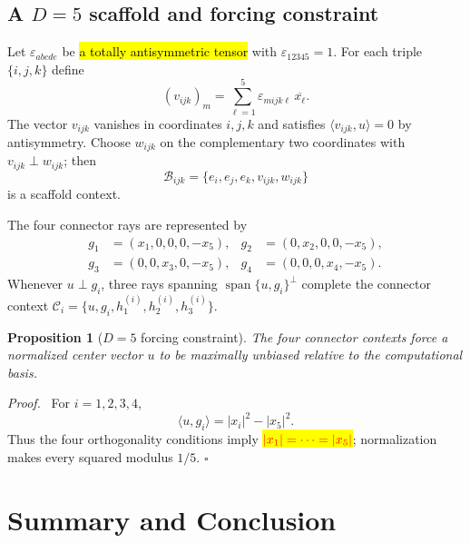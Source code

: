 \documentclass[%
  reprint,
  superscriptaddress,
  showpacs,
  showkeys,
  amsmath,amssymb,
  pra,
  longbibliography,
  floatfix,
  x11names
]{revtex4-2}
\newenvironment{revision}{\begingroup}{\endgroup}
\newcommand{\corr}[1]{{\color{red}\hl{#1}}}
\newcommand{\corrmath}[1]{\begingroup\setlength{\fboxsep}{1pt}\colorbox{yellow}{\ensuremath{\color{red}#1}}\endgroup}
\newtheorem{proposition}{Proposition}
\newenvironment{proof}{\par\noindent\textit{Proof.}\ }{\hfill$\square$\par}
\begin{document}
\begin{revision}
\subsection{A $D=5$ scaffold and forcing constraint}

Let $\varepsilon_{abcde}$ be \corr{a totally antisymmetric tensor}
with $\varepsilon_{12345}=1$.  For each triple $\{i,j,k\}$ define
\[
(v_{ijk})_m=\sum_{\ell=1}^5\varepsilon_{mijk\ell}\,\overline{x_\ell}.
\]
The vector $v_{ijk}$ vanishes in coordinates $i,j,k$ and satisfies $\langle v_{ijk},u\rangle=0$ by antisymmetry.  Choose $w_{ijk}$ on the complementary two coordinates with $v_{ijk}\perp w_{ijk}$; then
\[
\mathcal{B}_{ijk}=\{e_i,e_j,e_k,v_{ijk},w_{ijk}\}
\]
is a scaffold context.

The four connector rays are represented by
\begin{align*}
g_1&=(x_1,0,0,0,-x_5),&
g_2&=(0,x_2,0,0,-x_5),\\
g_3&=(0,0,x_3,0,-x_5),&
g_4&=(0,0,0,x_4,-x_5).
\end{align*}
Whenever $u\perp g_i$, three rays spanning $\operatorname{span}\{u,g_i\}^{\perp}$ complete the connector context $\mathcal{C}_i=\{u,g_i,h^{(i)}_1,h^{(i)}_2,h^{(i)}_3\}$.

\begin{proposition}[$D=5$ forcing constraint]
\label{prop:D5forcing}
The four connector contexts force a normalized center vector $u$ to be maximally unbiased relative to the computational basis.
\end{proposition}

\begin{proof}
For $i=1,2,3,4$,
\[
\langle u,g_i\rangle=|x_i|^2-|x_5|^2.
\]
Thus the four orthogonality conditions imply \corrmath{|x_1|=\cdots=|x_5|};
normalization makes every squared modulus $1/5$.
\end{proof}
\end{revision}

\section{Summary and Conclusion}

\end{document}
